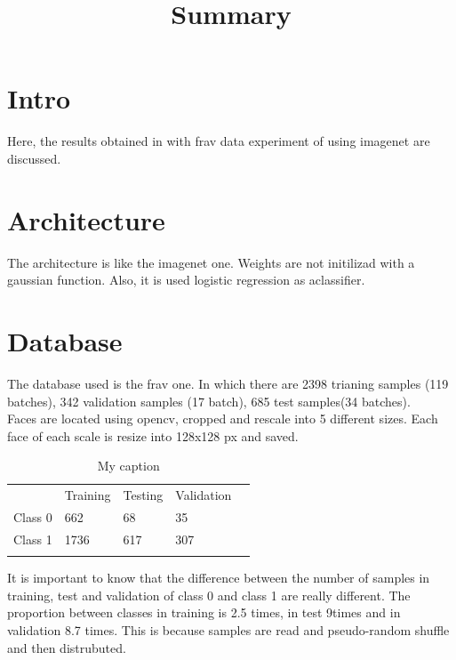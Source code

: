 \documentclass[a4paper]{article}
\begin{document}
\title{Summary}
\maketitle

\section{Intro}
Here, the results obtained in with frav data experiment of using imagenet are discussed.\\

\section{Architecture}
The architecture is like the imagenet one. Weights are not initilizad with a gaussian function. Also, it is used logistic regression as aclassifier.\\

\section{Database}
The database used is the frav one. In which there are 2398 trianing samples (119 batches), 342 validation samples (17 batch), 685 test samples(34 batches).\\

Faces are located using opencv, cropped and rescale into 5 different sizes. Each face of each scale is resize into 128x128 px and saved.\\

\begin{table}[]
\centering
\caption{My caption}
\label{my-label}
\begin{tabular}{lllll}
        & Training & Testing & Validation &  \\
Class 0 & 662      & 68      & 35         &  \\
Class 1 & 1736     & 617     & 307        &  \\
        &          &         &            & 
\end{tabular}
\end{table}


It is important to know that the difference between the number of samples in training, test and validation of class 0 and class 1 are really different. The proportion between classes in training is 2.5 times, in test 9times and in validation 8.7 times. This is because samples are read and pseudo-random shuffle and then distrubuted.\\
\end{document}
